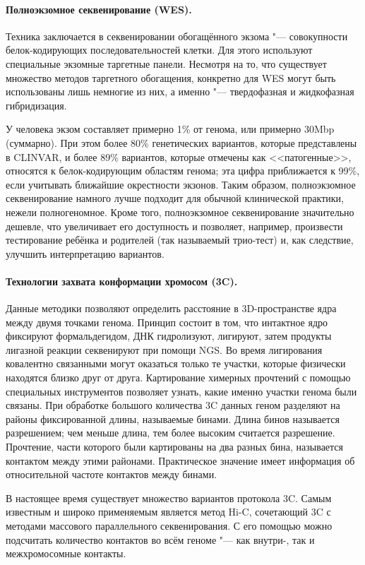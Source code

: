 \documentclass[a4paper,12pt]{article}
\begin{document}
\paragraph{Полноэкзомное секвенирование (WES).}
Техника заключается в секвенировании обогащённого экзома "--- совокупности белок-кодирующих последовательностей клетки.
Для этого используют специальные экзомные таргетные панели.
Несмотря на то, что существует множество методов таргетного обогащения, конкретно для WES могут быть использованы лишь немногие из них, а именно "--- твердофазная и жидкофазная гибридизация\cite{teer}.

У человека экзом составляет примерно 1\% от генома, или примерно 30Mbp (суммарно).
При этом более 80\% генетических вариантов, которые представлены в CLINVAR, и более 89\% вариантов, которые отмечены как <<патогенные>>, относятся к белок-кодирующим областям генома;
эта цифра приближается к 99\%, если учитывать ближайшие окрестности экзонов\cite{barbitoff}.
Таким образом, полноэкзомное секвенирование намного лучше подходит для обычной клинической практики, нежели полногеномное.
Кроме того, полноэкзомное секвенирование значительно дешевле, что увеличивает его доступность и позволяет, например, произвести тестирование ребёнка и родителей (так называемый трио-тест) и, как следствие, улучшить интерпретацию вариантов\cite{yohe}.

\paragraph{Технологии захвата конформации хромосом (3C).}
Данные методики позволяют определить расстояние в 3D-пространстве ядра между двумя точками генома.
Принцип состоит в том, что интактное ядро фиксируют формальдегидом, ДНК гидролизуют, лигируют, затем продукты лигазной реакции секвенируют при помощи NGS.
Во время лигирования ковалентно связанными могут оказаться только те участки, которые физически находятся близко друг от друга.
Картирование химерных прочтений с помощью специальных инструментов позволяет узнать, какие именно участки генома были связаны\cite{dekker}.
При обработке большого количества 3C данных геном разделяют на районы фиксированной длины, называемые бинами.
Длина бинов называется разрешением; чем меньше длина, тем более высоким считается разрешение.
Прочтение, части которого были картированы на два разных бина, называется контактом между этими районами.
Практическое значение имеет информация об относительной частоте контактов между бинами.

В настоящее время существует множество вариантов протокола 3C.
Самым известным и широко применяемым является метод Hi-C, сочетающий 3C с методами массового параллельного секвенирования.
С его помощью можно подсчитать количество контактов во всём геноме "--- как внутри-, так и межхромосомные контакты\cite{oluwadare}.
\end{document}
